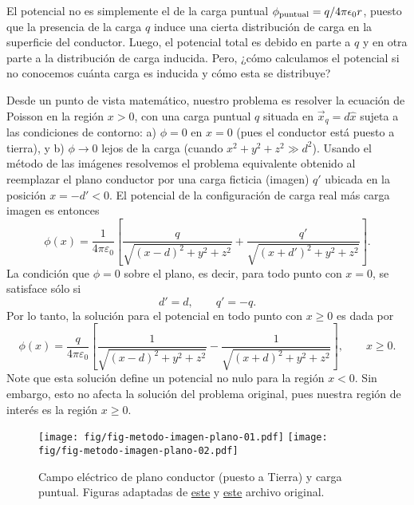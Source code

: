 El potencial no es simplemente el de la carga puntual $\phi_{\rm puntual} = {q}/{4\pi\epsilon_0 r}$, puesto que la presencia de la carga $q$ induce una cierta distribución de carga en la superficie del conductor. Luego, el potencial total es debido en parte a $q$ y en otra parte a la distribución de carga inducida. Pero, ¿cómo calculamos el potencial si no conocemos cuánta carga es inducida y cómo esta se distribuye? 

Desde un punto de vista matemático, nuestro problema es resolver la ecuación de Poisson en la región $x>0$, con una carga puntual $q$ situada en $\vec{x}_q=d\hat{x}$ sujeta a las condiciones de contorno: a) $\phi = 0 $ en $x=0$ (pues el conductor está puesto a tierra), y b) $\phi\rightarrow 0$ lejos de la carga (cuando $x^2 + y^2 + z^2 \gg d^2$). Usando el método de las imágenes resolvemos el problema equivalente obtenido al reemplazar el plano conductor por una carga ficticia (imagen) $q'$ ubicada en la posición $x=-d'<0$. El potencial de la configuración de carga real más carga imagen es entonces
\begin{equation}
 \phi(x)=\frac{1}{4\pi\varepsilon_0}\left[\frac{q}{\sqrt{(x-d)^2+y^2+z^2}}+\frac
{q'}{\sqrt{(x+d')^2+y^2+z^2}}\right].
\end{equation}
La condición que $\phi=0$ sobre el plano, es decir, para todo punto con $x=0$,
se satisface sólo si
\begin{equation}
 d'=d, \qquad q'=-q.
\end{equation}
Por lo tanto, la solución para el potencial en todo punto con $x\ge 0$ es dada por
\begin{equation}\label{phicpplano}
 \phi(x)=\frac{q}{4\pi\varepsilon_0}\left[\frac{1}{\sqrt{(x-d)^2+y^2+z^2}}-\frac
{1}{\sqrt{(x+d)^2+y^2+z^2}}\right], \qquad x\ge 0.
\end{equation}
Note que esta solución define un potencial no nulo para la región $x < 0$. Sin embargo, esto no afecta la solución del problema original, pues nuestra región de interés es la región $x \ge 0$.
\begin{center}
\begin{figure}[H]
\centerline{\texttt{[image: fig/fig-metodo-imagen-plano-01.pdf]}
\hspace{2cm}
\texttt{[image: fig/fig-metodo-imagen-plano-02.pdf]}}
\caption{Campo eléctrico de plano conductor (puesto a Tierra) y carga puntual. 
Figuras adaptadas de  \href{http://commons.wikimedia.org/wiki/File:VFPt_image_charge_plane_horizontal.svg}{este} y \href{http://commons.wikimedia.org/wiki/File:VFPt_image_charge_plane.svg}{este} archivo original.}
\label{fig:pyc}
\end{figure}
\end{center}
